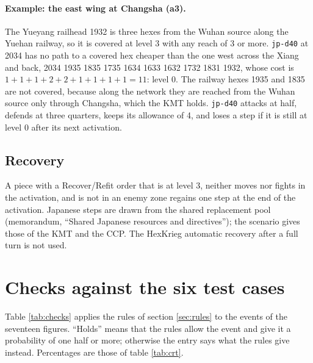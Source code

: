 \documentclass[11pt]{article}
\begin{document}
\paragraph{Example: the east wing at Changsha (a3).} The Yueyang railhead 1932 is three hexes from the Wuhan source along the Yuehan railway, so it is covered at level 3 with any reach of 3 or more. \texttt{jp-d40} at 2034 has no path to a covered hex cheaper than the one west across the Xiang and back, 2034 1935 1835 1735 1634 1633 1632 1732 1831 1932, whose cost is $1+1+1+2+2+1+1+1+1=11$: level 0. The railway hexes 1935 and 1835 are not covered, because along the network they are reached from the Wuhan source only through Changsha, which the KMT holds. \texttt{jp-d40} attacks at half, defends at three quarters, keeps its allowance of 4, and loses a step if it is still at level 0 after its next activation.

\subsection{Recovery}\label{sub:recovery}
A piece with a Recover/Refit order that is at level 3, neither moves nor fights in the activation, and is not in an enemy zone regains one step at the end of the activation. Japanese steps are drawn from the shared replacement pool (memorandum, ``Shared Japanese resources and directives''); the scenario gives those of the KMT and the CCP. The HexKrieg automatic recovery after a full turn is not used.

\section{Checks against the six test cases}\label{sec:checks}
Table \ref{tab:checks} applies the rules of section \ref{sec:rules} to the events of the seventeen figures. ``Holds'' means that the rules allow the event and give it a probability of one half or more; otherwise the entry says what the rules give instead. Percentages are those of table \ref{tab:crt}.
\end{document}

